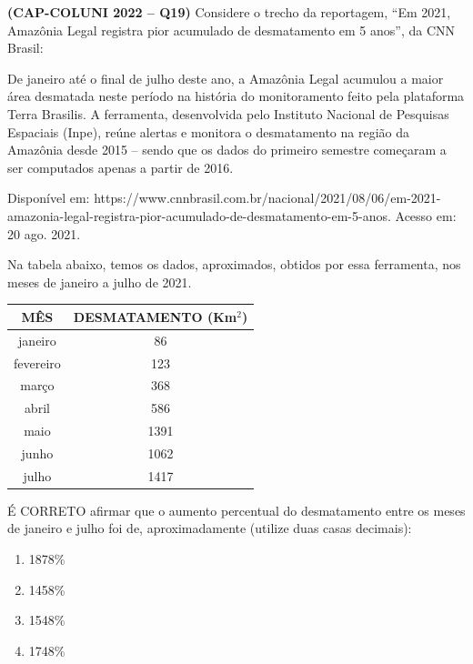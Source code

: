 \textbf{(CAP-COLUNI 2022 -- Q19)} Considere o trecho da reportagem, “Em 2021, Amazônia Legal registra pior acumulado de desmatamento em 5 anos”, da CNN Brasil:

De janeiro até o final de julho deste ano, a Amazônia Legal acumulou a maior área desmatada neste período na história do monitoramento feito pela plataforma Terra Brasilis. A ferramenta, desenvolvida pelo Instituto Nacional de Pesquisas Espaciais (Inpe), reúne alertas e monitora o desmatamento na região da Amazônia desde 2015 – sendo que os dados do primeiro semestre começaram a ser computados apenas a partir de 2016.

Disponível em: https://www.cnnbrasil.com.br/nacional/2021/08/06/em-2021-amazonia-legal-registra-pior-acumulado-de-desmatamento-em-5-anos. Acesso em: 20 ago. 2021.

Na tabela abaixo, temos os dados, aproximados, obtidos por essa ferramenta, nos meses de janeiro a julho de 2021.

\begin{center}
\scriptsize
\begin{tabular}{c|c}
MÊS & DESMATAMENTO (Km$^2$)\\ \hline
janeiro & 86\\
fevereiro & 123\\
março & 368\\
abril & 586\\
maio & 1391\\
junho & 1062\\
julho & 1417
\end{tabular}
\end{center}

É CORRETO afirmar que o aumento percentual do desmatamento entre os meses de janeiro e julho foi de, aproximadamente (utilize duas casas decimais):

\begin{enumerate}
	\item 1878\%
	\item 1458\%
	\item 1548\%
	\item 1748\%
\end{enumerate}
